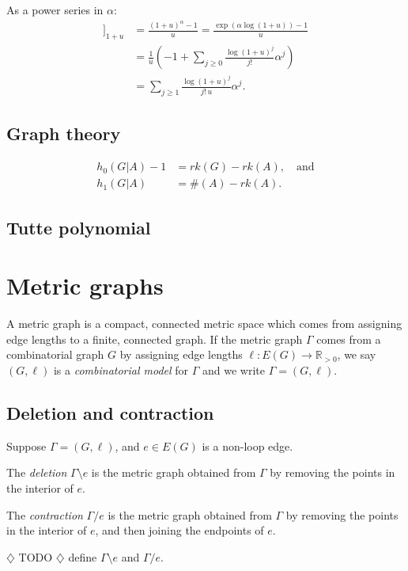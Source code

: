 \documentclass{amsart}
\theoremstyle{definition}
\newcommand{\RR}{\mathbb{R}}
\newcommand{\RRpos}{\RR_{>0}}
\newcommand{\fanalog}[2]{[\![#2]\!]_{#1}}
\newcommand{\harry}[1]{{\color{red} \sf $\diamondsuit$  {#1} $\diamondsuit$ }}
\newcommand{\note}[1]{\harry{#1}}
\begin{document}
As a power series in $\alpha$:
\begin{align*}
\fanalog{1 + u}{\alpha} &= \frac{(1+u)^\alpha - 1}{u}
= \frac{\exp(\alpha \log(1+u)) - 1}{u} \\
&= \frac1{u} \left( -1 + \sum_{j\geq 0} \frac{\log(1+u)^j}{j!} \alpha^j\right) \\
&= \sum_{j\geq 1} \frac{\log(1+u)^j}{j! \, u} \alpha^j .
\end{align*}

\subsection{Graph theory}
\begin{align*}
h_0(G| A) - 1 &= rk(G) - rk(A), \quad\text{and}\\
h_1(G| A) &= \#(A) - rk(A) .
\end{align*}


\subsection{Tutte polynomial}

\section{Metric graphs}
A metric graph is a compact, connected metric space which comes from 
assigning edge lengths to a finite, connected graph.
If the metric graph $\Gamma$
comes from a combinatorial graph $G$ by 
assigning edge lengths $\ell : E(G) \to \RRpos$,
we say $(G,\ell)$ is a {\em combinatorial model} for $\Gamma$
and we write $\Gamma = (G,\ell)$.

\subsection{Deletion and contraction}

Suppose $\Gamma = (G,\ell)$, and $e \in E(G)$ is a non-loop edge.

The {\em deletion} $\Gamma \setminus e$ is the metric graph obtained from $\Gamma$ by removing the points in the interior of $e$.

The {\em contraction} $\Gamma / e$ is the metric graph obtained from $\Gamma$ by removing the points in the interior of $e$, and then joining the endpoints of $e$.

\note{TODO} define $\Gamma \setminus e$ and $\Gamma / e$.
\end{document}
